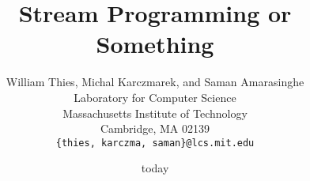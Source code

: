 \documentclass{acm_proc_article-sp}
\begin{document}
\title{Stream Programming or Something}

\author{
\alignauthor William Thies, Michal Karczmarek, and Saman Amarasinghe\\
	\vspace{12pt}
	Laboratory for Computer Science \\
	Massachusetts Institute of Technology \\
	Cambridge, MA  02139 \\
	\vspace{12pt}
	{\tt \{thies, karczma, saman\}@lcs.mit.edu}
}

\date{today}

\maketitle







\end{document}
